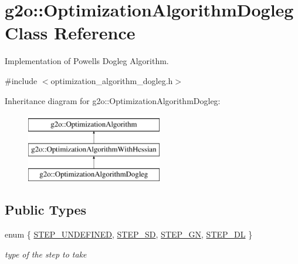 \hypertarget{classg2o_1_1_optimization_algorithm_dogleg}{}\section{g2o\+:\+:Optimization\+Algorithm\+Dogleg Class Reference}
\label{classg2o_1_1_optimization_algorithm_dogleg}


Implementation of Powell\textquotesingle{}s Dogleg Algorithm.  




{\ttfamily \#include $<$optimization\+\_\+algorithm\+\_\+dogleg.\+h$>$}

Inheritance diagram for g2o\+:\+:Optimization\+Algorithm\+Dogleg\+:\begin{figure}[H]
\begin{center}
\leavevmode
\includegraphics[height=3.000000cm]{classg2o_1_1_optimization_algorithm_dogleg}
\end{center}
\end{figure}
\subsection*{Public Types}
\begin{DoxyCompactItemize}
\item 
enum \{ \mbox{\hyperlink{classg2o_1_1_optimization_algorithm_dogleg_a431b0b88011685955381bdeb68bb5390ae098265840915f1d6877b4e27fbec1d8}{S\+T\+E\+P\+\_\+\+U\+N\+D\+E\+F\+I\+N\+ED}}, 
\mbox{\hyperlink{classg2o_1_1_optimization_algorithm_dogleg_a431b0b88011685955381bdeb68bb5390a02cb99985ea3c35b57591e6c55f5e037}{S\+T\+E\+P\+\_\+\+SD}}, 
\mbox{\hyperlink{classg2o_1_1_optimization_algorithm_dogleg_a431b0b88011685955381bdeb68bb5390a27f521fdfb791c330af5e59dd989507d}{S\+T\+E\+P\+\_\+\+GN}}, 
\mbox{\hyperlink{classg2o_1_1_optimization_algorithm_dogleg_a431b0b88011685955381bdeb68bb5390a1bc0276b59002bc8892ea9fc39348d1d}{S\+T\+E\+P\+\_\+\+DL}}
 \}
\begin{DoxyCompactList}\small\item\em type of the step to take \end{DoxyCompactList}\end{DoxyCompactItemize}
